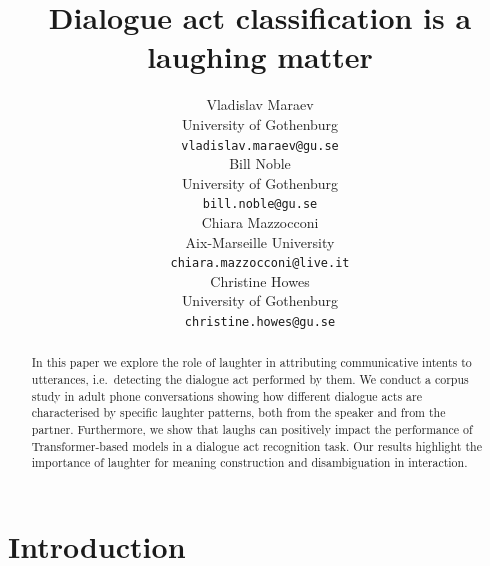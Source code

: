 \documentclass[11pt,a4paper]{article}
\title{Dialogue act classification is a laughing matter}
\author{Vladislav Maraev \\
  University of Gothenburg \\
  \texttt{vladislav.maraev@gu.se} \\\And
  Bill Noble \\
  University of Gothenburg \\
  \texttt{bill.noble@gu.se} \\\AND
  Chiara Mazzocconi  \\
  Aix-Marseille University \\
  \texttt{chiara.mazzocconi@live.it} \\\And
  Christine Howes \\
  University of Gothenburg \\
  \texttt{christine.howes@gu.se} \\}
\date{}
\begin{document}
\maketitle
\begin{abstract}
  In this paper we explore the role of laughter in attributing
  communicative intents to utterances, i.e.\ detecting the dialogue act
  performed by them. We conduct a corpus study in adult
  phone conversations showing how different dialogue acts are
  characterised by specific laughter patterns, both from the speaker
  and from the partner. Furthermore, we show that laughs can
  positively impact the performance of Transformer-based models in a
  dialogue act recognition task.  Our results highlight the importance
  of laughter for meaning construction and disambiguation in
  interaction.
\end{abstract}


\section{Introduction}
\end{document}
